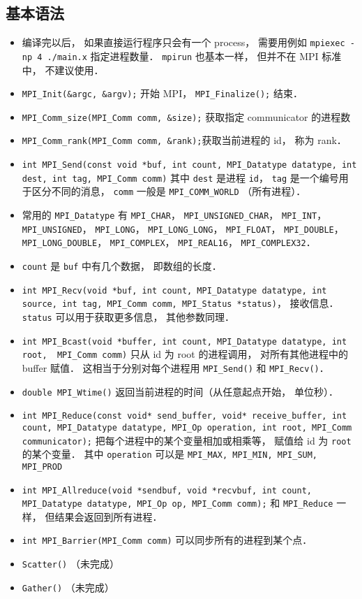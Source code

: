 \subsection{基本语法}
\begin{itemize}
\item 编译完以后， 如果直接运行程序只会有一个 process， 需要用例如 \verb|mpiexec -np 4 ./main.x| 指定进程数量． \verb|mpirun| 也基本一样， 但并不在 MPI 标准中， 不建议使用．
\item \verb|MPI_Init(&argc, &argv);| 开始 MPI， \verb|MPI_Finalize();| 结束．
\item \verb|MPI_Comm_size(MPI_Comm comm, &size);| 获取指定 communicator 的进程数
\item \verb|MPI_Comm_rank(MPI_Comm comm, &rank);|获取当前进程的 id， 称为 rank．
\item \verb|int MPI_Send(const void *buf, int count, MPI_Datatype datatype, int dest, int tag, MPI_Comm comm)| 其中 \verb|dest| 是进程 \verb|id|， \verb|tag| 是一个编号用于区分不同的消息， \verb|comm| 一般是 \verb|MPI_COMM_WORLD| （所有进程）．
\item 常用的 \verb|MPI_Datatype| 有 \verb|MPI_CHAR|， \verb|MPI_UNSIGNED_CHAR|， \verb|MPI_INT|， \verb|MPI_UNSIGNED|， \verb|MPI_LONG|， \verb|MPI_LONG_LONG|， \verb|MPI_FLOAT|， \verb|MPI_DOUBLE|， \verb|MPI_LONG_DOUBLE|， \verb|MPI_COMPLEX|， \verb|MPI_REAL16|， \verb|MPI_COMPLEX32|．
\item \verb|count| 是 \verb|buf| 中有几个数据， 即数组的长度．
\item \verb|int MPI_Recv(void *buf, int count, MPI_Datatype datatype, int source, int tag, MPI_Comm comm, MPI_Status *status)|， 接收信息． \verb|status| 可以用于获取更多信息， 其他参数同理．
\item \verb|int MPI_Bcast(void *buffer, int count, MPI_Datatype datatype, int root,  MPI_Comm comm)| 只从 id 为 root 的进程调用， 对所有其他进程中的 buffer 赋值． 这相当于分别对每个进程用 \verb|MPI_Send()| 和 \verb|MPI_Recv()|．
\item \verb|double MPI_Wtime()| 返回当前进程的时间（从任意起点开始， 单位秒）．
\item \verb|int MPI_Reduce(const void* send_buffer, void* receive_buffer, int count, MPI_Datatype datatype, MPI_Op operation, int root, MPI_Comm communicator);| 把每个进程中的某个变量相加或相乘等， 赋值给 id 为 \verb|root| 的某个变量． 其中 \verb|operation| 可以是 \verb|MPI_MAX, MPI_MIN, MPI_SUM, MPI_PROD|
\item \verb|int MPI_Allreduce(void *sendbuf, void *recvbuf, int count, MPI_Datatype datatype, MPI_Op op, MPI_Comm comm);| 和 \verb|MPI_Reduce| 一样， 但结果会返回到所有进程．
\item \verb|int MPI_Barrier(MPI_Comm comm)| 可以同步所有的进程到某个点．
\item \verb|Scatter()| （未完成）
\item \verb|Gather()| （未完成）
\end{itemize}


